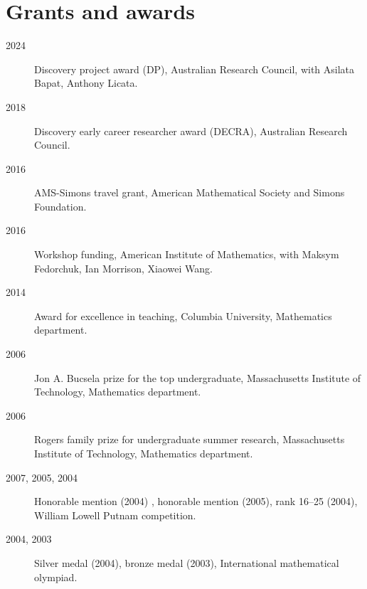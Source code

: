 \documentclass[11pt]{article}
\begin{document}
\section*{Grants and awards}
\label{sec:orgaf08463}
\label{org34551de}
\begin{description}
\item[{2024}] Discovery project award (DP), Australian Research Council, with Asilata Bapat, Anthony Licata.
\item[{2018}] Discovery early career researcher award (DECRA), Australian Research Council.
\item[{2016}] AMS-Simons travel grant, American Mathematical Society and Simons Foundation.
\item[{2016}] Workshop funding, American Institute of Mathematics, with Maksym Fedorchuk, Ian Morrison, Xiaowei Wang.
\item[{2014}] Award for excellence in teaching, Columbia University, Mathematics department.
\item[{2006}] Jon A. Bucsela prize for the top undergraduate, Massachusetts Institute of Technology, Mathematics department.
\item[{2006}] Rogers family prize for undergraduate summer research, Massachusetts Institute of Technology, Mathematics department.
\item[{2007, 2005, 2004}] Honorable mention (2004) , honorable mention (2005), rank 16--25 (2004), William Lowell Putnam competition.
\item[{2004, 2003}] Silver medal (2004), bronze medal (2003), International mathematical olympiad.
\end{description}
\end{document}
